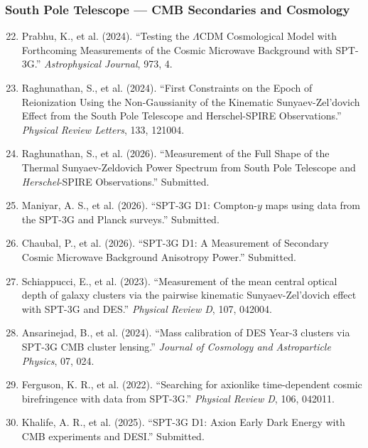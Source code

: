 \documentclass[11pt,a4paper]{article}
\begin{document}
\subsubsection*{South Pole Telescope --- CMB Secondaries and Cosmology}

\begin{enumerate}
\setcounter{enumi}{21}
\item Prabhu, K., et al. (2024). ``Testing the $\Lambda$CDM Cosmological Model with Forthcoming Measurements of the Cosmic Microwave Background with SPT-3G.'' \textit{Astrophysical Journal}, 973, 4.

\item Raghunathan, S., et al. (2024). ``First Constraints on the Epoch of Reionization Using the Non-Gaussianity of the Kinematic Sunyaev-Zel'dovich Effect from the South Pole Telescope and Herschel-SPIRE Observations.'' \textit{Physical Review Letters}, 133, 121004.

\item Raghunathan, S., et al. (2026). ``Measurement of the Full Shape of the Thermal Sunyaev-Zeldovich Power Spectrum from South Pole Telescope and \textit{Herschel}-SPIRE Observations.'' Submitted.

\item Maniyar, A. S., et al. (2026). ``SPT-3G D1: Compton-$y$ maps using data from the SPT-3G and Planck surveys.'' Submitted.

\item Chaubal, P., et al. (2026). ``SPT-3G D1: A Measurement of Secondary Cosmic Microwave Background Anisotropy Power.'' Submitted.

\item Schiappucci, E., et al. (2023). ``Measurement of the mean central optical depth of galaxy clusters via the pairwise kinematic Sunyaev-Zel'dovich effect with SPT-3G and DES.'' \textit{Physical Review D}, 107, 042004.

\item Ansarinejad, B., et al. (2024). ``Mass calibration of DES Year-3 clusters via SPT-3G CMB cluster lensing.'' \textit{Journal of Cosmology and Astroparticle Physics}, 07, 024.

\item Ferguson, K. R., et al. (2022). ``Searching for axionlike time-dependent cosmic birefringence with data from SPT-3G.'' \textit{Physical Review D}, 106, 042011.

\item Khalife, A. R., et al. (2025). ``SPT-3G D1: Axion Early Dark Energy with CMB experiments and DESI.'' Submitted.


\end{enumerate}
\end{document}
